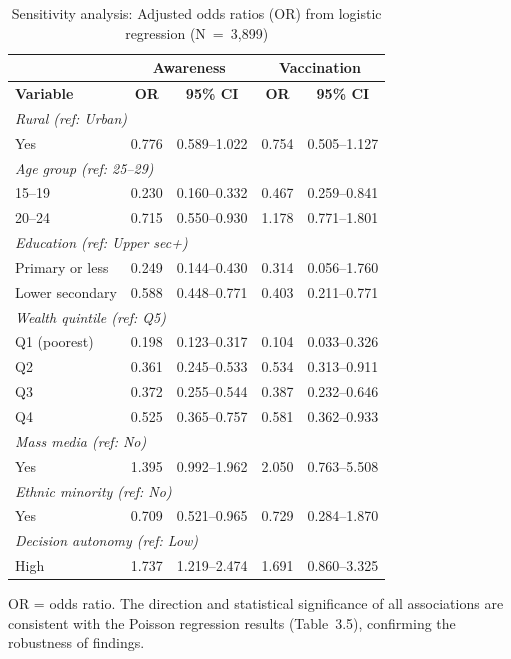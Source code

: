 \begin{table}[htbp]
\caption{Sensitivity analysis: Adjusted odds ratios (OR) from logistic regression (N~=~3,899)}
\centering
\small
\begin{tabular}{|p{3.5cm}|c|c|c|c|}
\hline
 & \multicolumn{2}{c|}{\textbf{Awareness}} & \multicolumn{2}{c|}{\textbf{Vaccination}} \\
\hline
\textbf{Variable} & \textbf{OR} & \textbf{95\% CI} & \textbf{OR} & \textbf{95\% CI} \\
\hline
\multicolumn{5}{|l|}{\textit{Rural (ref: Urban)}} \\
\hline
Yes & 0.776 & 0.589--1.022 & 0.754 & 0.505--1.127 \\
\hline
\multicolumn{5}{|l|}{\textit{Age group (ref: 25--29)}} \\
\hline
15--19 & 0.230 & 0.160--0.332 & 0.467 & 0.259--0.841 \\
20--24 & 0.715 & 0.550--0.930 & 1.178 & 0.771--1.801 \\
\hline
\multicolumn{5}{|l|}{\textit{Education (ref: Upper sec+)}} \\
\hline
Primary or less & 0.249 & 0.144--0.430 & 0.314 & 0.056--1.760 \\
Lower secondary & 0.588 & 0.448--0.771 & 0.403 & 0.211--0.771 \\
\hline
\multicolumn{5}{|l|}{\textit{Wealth quintile (ref: Q5)}} \\
\hline
Q1 (poorest) & 0.198 & 0.123--0.317 & 0.104 & 0.033--0.326 \\
Q2 & 0.361 & 0.245--0.533 & 0.534 & 0.313--0.911 \\
Q3 & 0.372 & 0.255--0.544 & 0.387 & 0.232--0.646 \\
Q4 & 0.525 & 0.365--0.757 & 0.581 & 0.362--0.933 \\
\hline
\multicolumn{5}{|l|}{\textit{Mass media (ref: No)}} \\
\hline
Yes & 1.395 & 0.992--1.962 & 2.050 & 0.763--5.508 \\
\hline
\multicolumn{5}{|l|}{\textit{Ethnic minority (ref: No)}} \\
\hline
Yes & 0.709 & 0.521--0.965 & 0.729 & 0.284--1.870 \\
\hline
\multicolumn{5}{|l|}{\textit{Decision autonomy (ref: Low)}} \\
\hline
High & 1.737 & 1.219--2.474 & 1.691 & 0.860--3.325 \\
\hline
\end{tabular}
\label{tab:logistic}

\vspace{0.2cm}
\footnotesize{OR = odds ratio. The direction and statistical significance of all associations are consistent with the Poisson regression results (Table~3.5), confirming the robustness of findings.}
\end{table}

